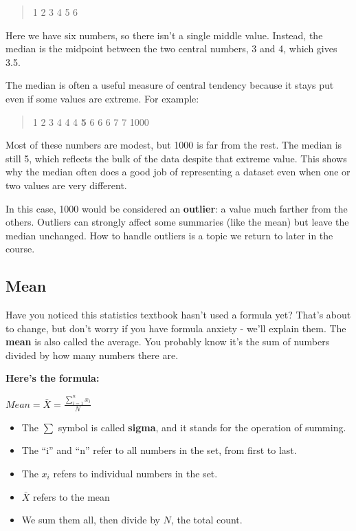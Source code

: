 \documentclass[
  letterpaper,
  DIV=11,
  numbers=noendperiod]{scrreprt}
\begin{document}
\begin{quote}
1 2 3 4 5 6
\end{quote}

Here we have six numbers, so there isn't a single middle value. Instead,
the median is the midpoint between the two central numbers, 3 and 4,
which gives 3.5.

The median is often a useful measure of central tendency because it
stays put even if some values are extreme. For example:

\begin{quote}
1 2 3 4 4 4 \textbf{5} 6 6 6 7 7 1000
\end{quote}

Most of these numbers are modest, but 1000 is far from the rest. The
median is still 5, which reflects the bulk of the data despite that
extreme value. This shows why the median often does a good job of
representing a dataset even when one or two values are very different.

In this case, 1000 would be considered an \textbf{outlier}: a value much
farther from the others. Outliers can strongly affect some summaries
(like the mean) but leave the median unchanged. How to handle outliers
is a topic we return to later in the course.

\subsection{Mean}\label{mean}

Have you noticed this statistics textbook hasn't used a formula yet?
That's about to change, but don't worry if you have formula anxiety -
we'll explain them. The \textbf{mean} is also called the average. You
probably know it's the sum of numbers divided by how many numbers there
are.

\textbf{Here's the formula:}

\(Mean = \bar{X} = \frac{\sum_{i=1}^{n} x_{i}}{N}\)

\begin{itemize}
\item
  The \(\sum\) symbol is called \textbf{sigma}, and it stands for the
  operation of summing.
\item
  The ``i'' and ``n'' refer to all numbers in the set, from first to
  last.
\item
  The \(x_{i}\) refers to individual numbers in the set.
\item
  \(\bar{X}\) refers to the mean
\item
  We sum them all, then divide by \(N\), the total count.
\end{itemize}
\end{document}
